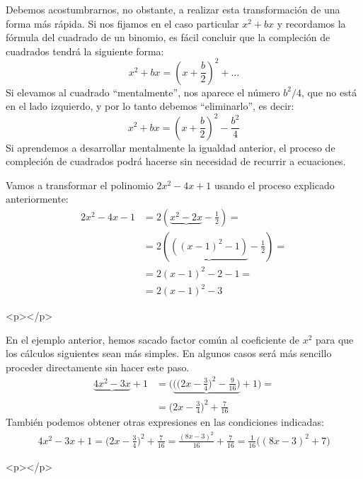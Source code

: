 Debemos acostumbrarnos, no obstante, a realizar esta transformación de una forma más rápida.
Si nos fijamos en el caso particular $x^2+bx$ y recordamos la fórmula del cuadrado de un binomio, es fácil concluir que la compleción de cuadrados tendrá la siguiente forma:
\[
x^2+bx = \left(x+\frac{b}2\right)^2+\dots
\]
Si elevamos al cuadrado ``mentalmente'', nos aparece el número $b^2/4$, que no está en el lado izquierdo, y por lo tanto debemos ``eliminarlo'', es decir:
\[
x^2+bx = \left(x+\frac{b}2\right)^2-\frac{b^2}4
\]
Si aprendemos a desarrollar mentalmente la igualdad anterior, el proceso de compleción de cuadrados podrá hacerse sin necesidad de recurrir a ecuaciones.
%
\begin{ejemplo}
Vamos a transformar el polinomio $2x^2-4x+1$ usando el proceso explicado anteriormente:
\begin{align*}
2x^2-4x-1 & = 2\left(\underbrace{x^2-2x}-\frac12\right)=\\
& = 2\left(\underbrace{((x-1)^2-1)}-\frac12\right)=\\
& = 2(x-1)^2-2-1=\\
& = 2(x-1)^2-3\tag*{\fej}
\end{align*}
\end{ejemplo}
\begin{rawhtml}
<p></p>
\end{rawhtml}
\begin{ejemplo}
En el ejemplo anterior, hemos sacado factor común al coeficiente de $x^2$ para que los cálculos siguientes sean más simples.
En algunos casos será más sencillo proceder directamente sin hacer este paso. 
%
\begin{align*}
\underbrace{4x^2-3x}+1 & = \Big(\underbrace{\Big(\Big(2x-\frac34\Big)^2-\frac9{16}\Big)}+1\Big)=\\
& = \Big(2x-\frac34\Big)^2+\frac7{16}
\end{align*}
También podemos obtener otras expresiones en las condiciones indicadas:
\begin{align*}
4x^2-3x+1 = \Big(2x-\frac34\Big)^2+\frac7{16}=
\frac{(8x-3)^2}{16}+\frac7{16} = \frac1{16}\Big((8x-3)^2+7\Big)\tag*{\fej}
\end{align*}
\end{ejemplo}
\begin{rawhtml}
<p></p>
\end{rawhtml}
